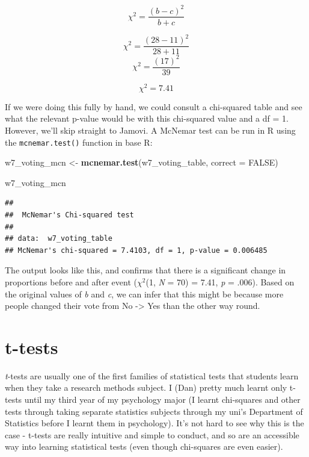 \documentclass[
]{book}
\newenvironment{Shaded}{\begin{snugshade}}{\end{snugshade}}
\newcommand{\AttributeTok}[1]{\textcolor[rgb]{0.13,0.29,0.53}{#1}}
\newcommand{\ConstantTok}[1]{\textcolor[rgb]{0.56,0.35,0.01}{#1}}
\newcommand{\FunctionTok}[1]{\textcolor[rgb]{0.13,0.29,0.53}{\textbf{#1}}}
\newcommand{\NormalTok}[1]{#1}
\newcommand{\OtherTok}[1]{\textcolor[rgb]{0.56,0.35,0.01}{#1}}
\begin{document}
\[
\chi^2 = \frac{(b-c)^2}{b+c}
\]

\[
\chi^2 = \frac{(28-11)^2}{28+11}
\]
\[
\chi^2 = \frac{(17)^2}{39}
\]

\[
\chi^2 = 7.41
\]

If we were doing this fully by hand, we could consult a chi-squared table and see what the relevant p-value would be with this chi-squared value and a df = 1. However, we'll skip straight to Jamovi. A McNemar test can be run in R using the \texttt{mcnemar.test()} function in base R:

\begin{Shaded}
\begin{Highlighting}[]
\NormalTok{w7\_voting\_mcn }\OtherTok{\textless{}{-}} \FunctionTok{mcnemar.test}\NormalTok{(w7\_voting\_table, }\AttributeTok{correct =} \ConstantTok{FALSE}\NormalTok{)}

\NormalTok{w7\_voting\_mcn}
\end{Highlighting}
\end{Shaded}

\begin{verbatim}
## 
##  McNemar's Chi-squared test
## 
## data:  w7_voting_table
## McNemar's chi-squared = 7.4103, df = 1, p-value = 0.006485
\end{verbatim}

The output looks like this, and confirms that there is a significant change in proportions before and after event (\(\chi^2\)(1, \emph{N} = 70) = 7.41, \emph{p} = .006). Based on the original values of \emph{b} and \emph{c}, we can infer that this might be because more people changed their vote from No -\textgreater{} Yes than the other way round.

\chapter{t-tests}\label{t-tests}

\emph{t}-tests are usually one of the first families of statistical tests that students learn when they take a research methods subject. I (Dan) pretty much learnt only t-tests until my third year of my psychology major (I learnt chi-squares and other tests through taking separate statistics subjects through my uni's Department of Statistics before I learnt them in psychology). It's not hard to see why this is the case - t-tests are really intuitive and simple to conduct, and so are an accessible way into learning statistical tests (even though chi-squares are even easier).
\end{document}
